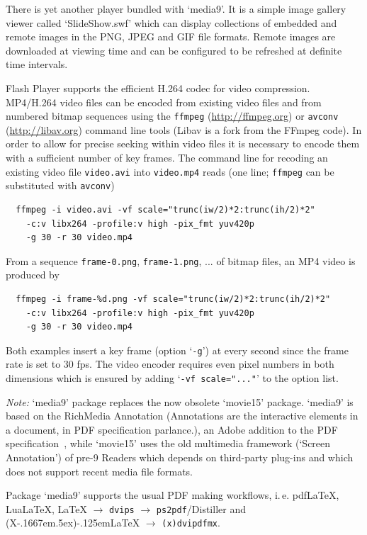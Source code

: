 \documentclass[a4paper]{article}
\def\pXepLaTeX{(X\kern-.1667em\lower.5ex\hbox{\reflectbox{E}})\kern-.125em\LaTeX}
\begin{document}
There is yet another player bundled with `media9'. It is a simple image gallery viewer called `SlideShow.swf' which can display collections of embedded and remote images in the PNG, JPEG and GIF file formats. Remote images are downloaded at viewing time and can be configured to be refreshed at definite time intervals.

Flash Player supports the efficient H.264 codec for video compression. MP4/H.264 video files can be encoded from existing video files and from numbered bitmap sequences using the \verb+ffmpeg+ (\url{http://ffmpeg.org}) or \verb+avconv+ (\url{http://libav.org}) command line tools (Libav is a fork from the FFmpeg code). In order to allow for precise seeking within video files it is necessary to encode them with a sufficient number of key frames. The command line for recoding an existing video file \verb+video.avi+ into \verb+video.mp4+ reads (one line; \verb+ffmpeg+ can be substituted with \verb+avconv+)
\begin{center}
\begin{Verbatim}
  ffmpeg -i video.avi -vf scale="trunc(iw/2)*2:trunc(ih/2)*2"
    -c:v libx264 -profile:v high -pix_fmt yuv420p
    -g 30 -r 30 video.mp4
\end{Verbatim}
\end{center}
From a sequence \verb+frame-0.png+, \verb+frame-1.png+, ... of bitmap files, an MP4 video is produced by
\begin{Verbatim}
  ffmpeg -i frame-%d.png -vf scale="trunc(iw/2)*2:trunc(ih/2)*2"
    -c:v libx264 -profile:v high -pix_fmt yuv420p
    -g 30 -r 30 video.mp4
\end{Verbatim}
Both examples insert a key frame (option `\verb+-g+') at every second since the frame rate is set to 30 fps. The video encoder requires even pixel numbers in both dimensions which is ensured by adding `\verb+-vf scale="..."+' to the option list.

\emph{Note:} `media9' package replaces the now obsolete `movie15' package. `media9' is based on the RichMedia Annotation (Annotations are the interactive elements in a document, in PDF specification parlance.), an Adobe addition to the PDF specification~\cite{supplement}, while `movie15' uses the old multimedia framework (`Screen Annotation') of pre-9 Readers which depends on third-party plug-ins and which does not support recent media file formats.

Package `media9' supports the usual PDF making workflows, i.\,e. pdf\LaTeX{}, Lua\LaTeX, \LaTeX{} $\rightarrow$ \verb+dvips+ $\rightarrow$ \verb+ps2pdf+/Distiller and \pXepLaTeX{} $\rightarrow$ \verb+(x)dvipdfmx+.
\end{document}
